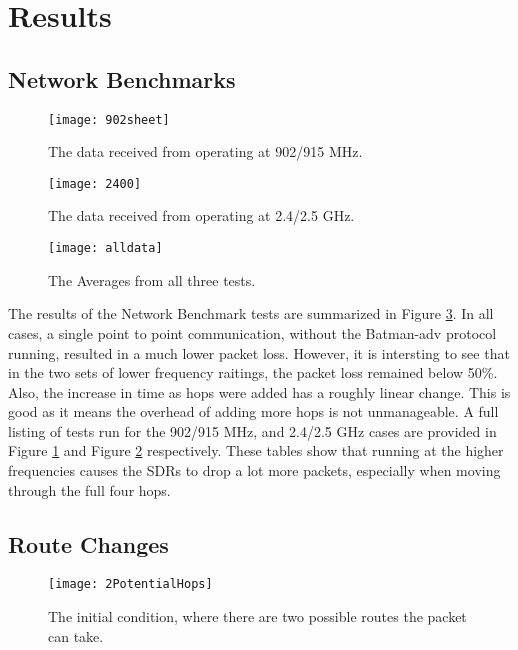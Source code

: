 \section{Results}

\subsection{Network Benchmarks}

\begin{figure}
	\centering
	\texttt{[image: 902sheet]}
	\caption{The data received from operating at 902/915 MHz.}
	\label{fig:902}
\end{figure}

\begin{figure}
	\centering
	\texttt{[image: 2400]}
	\caption{The data received from operating at 2.4/2.5 GHz.}
	\label{fig:2400}
\end{figure}

\begin{figure}
	\centering
	\texttt{[image: alldata]}
	\caption{The Averages from all three tests.}
	\label{fig:alldata}
\end{figure}

The results of the Network Benchmark tests are summarized in Figure \ref{fig:alldata}. In all cases, a single point to point communication, without the Batman-adv protocol running, resulted in a much lower packet loss. However, it is intersting to see that in the two sets of lower frequency raitings, the packet loss remained below 50\%. Also, the increase in time as hops were added has a roughly linear change. This is good as it means the overhead of adding more hops is not unmanageable. A full listing of tests run for the 902/915 MHz, and 2.4/2.5 GHz cases are provided in Figure \ref{fig:902} and Figure \ref{fig:2400} respectively. These tables show that running at the higher frequencies causes the SDRs to drop a lot more packets, especially when moving through the full four hops.  


\subsection{Route Changes}

\begin{figure*}
	\centering
	\texttt{[image: 2PotentialHops]}
	\caption{The initial condition, where there are two possible routes the packet can take.}
	\label{fig:2Hops}
\end{figure*}

